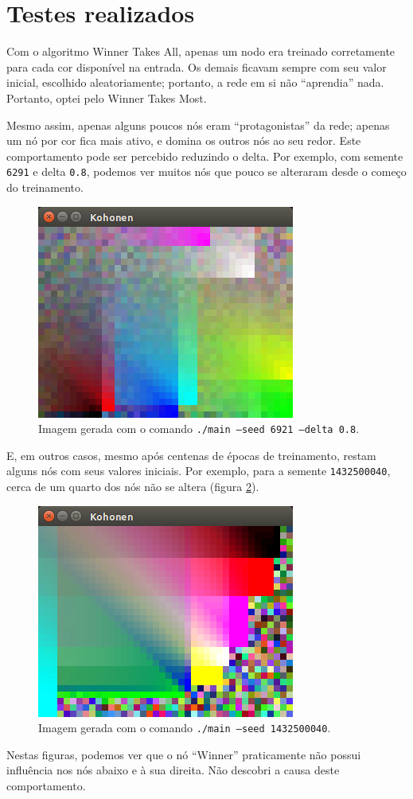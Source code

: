 \documentclass{article}
\begin{document}
\section{Testes realizados}

Com o algoritmo Winner Takes All,
apenas um nodo era treinado corretamente para cada cor disponível na entrada.
Os demais ficavam sempre com seu valor inicial,
escolhido aleatoriamente;
portanto, a rede em si não ``aprendia'' nada.
Portanto, optei pelo Winner Takes Most.

Mesmo assim, apenas alguns poucos nós eram ``protagonistas'' da rede;
apenas um nó por cor fica mais ativo,
e domina os outros nós ao seu redor.
Este comportamento pode ser percebido reduzindo o delta.
Por exemplo, com semente \lstinline"6291" e delta \lstinline"0.8",
podemos ver muitos nós que pouco se alteraram desde o começo do treinamento.

\begin{figure}[h]
    \centering
    \includegraphics[scale=0.5]{demo2.png}
    \caption{
        Imagem gerada com o comando
        \texttt{./main --seed 6921 --delta 0.8}.
    }
    \label{demo2}
\end{figure}

E, em outros casos,
mesmo após centenas de épocas de treinamento,
restam alguns nós com seus valores iniciais.
Por exemplo, para a semente \lstinline"1432500040",
cerca de um quarto dos nós não se altera
(figura \ref{demo3}).

\begin{figure}[h]
    \centering
    \includegraphics[scale=0.5]{demo3.png}
    \caption{
        Imagem gerada com o comando
        \texttt{./main --seed 1432500040}.
    }
    \label{demo3}
\end{figure}

Nestas figuras, podemos ver que o nó ``Winner''
praticamente não possui influência nos nós abaixo e à sua direita.
Não descobri a causa deste comportamento.
\end{document}
